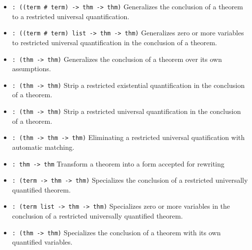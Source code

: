 \begin{itemize}
\item {} \verb|: ((term # term) -> thm -> thm)|\newline
Generalizes the conclusion of a theorem to a restricted universal quantification.

\item {} \verb|: ((term # term) list -> thm -> thm)|\newline
Generalizes zero or more variables to restricted universal quantification
in the conclusion of a theorem.

\item {} \verb|: (thm -> thm)|\newline
Generalizes the conclusion of a theorem over its own assumptions.

\item {} \verb|: (thm -> thm)|\newline
Strip a restricted existential quantification in the conclusion of a theorem.

\item {} \verb|: (thm -> thm)|\newline
Strip a restricted universal quantification in the conclusion of a theorem.

\item {} \verb|: (thm -> thm -> thm)|\newline
Eliminating a restricted universal quatification with automatic matching.

\item {} \verb|: thm -> thm|\newline
Transform a theorem into a form accepted for rewriting

\item {} \verb|: (term -> thm -> thm)|\newline
Specializes the conclusion of a restricted universally quantified theorem.

\item {} \verb|: (term list -> thm -> thm)|\newline
Specializes zero or more variables in the conclusion of a restricted
universally quantified theorem.

\item {} \verb|: (thm -> thm)|\newline
Specializes the conclusion of a theorem with its own quantified variables.
\end{itemize}

